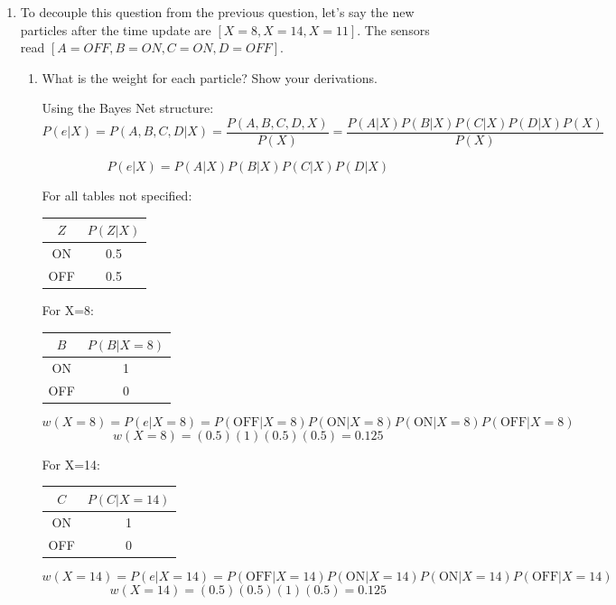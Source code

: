\documentclass[12pt]{article}
\begin{document}
\begin{enumerate}
\item To decouple this question from the previous question, let's say
  the new particles after the time update are $[X=8, X=14, X=11]$.
  The sensors read $[A=OFF, B=ON, C=ON, D=OFF]$.

  \begin{enumerate}

  \item What is the weight for each particle?  Show your derivations.

  Using the Bayes Net structure:
  \[
    P(e|X) = P(A,B,C,D|X) = \frac{P(A,B,C,D,X)}{P(X)} = \frac{P(A|X)P(B|X)P(C|X)P(D|X)P(X)}{P(X)}
  \]

  \[
    P(e|X) = P(A|X)P(B|X)P(C|X)P(D|X)
  \]

  For all tables not specified: 
  \begin{center}
    \begin{tabular}{|c|c|}
      \hline
      $Z$ & $P(Z|X)$ \\
      \hline
      ON & 0.5 \\
      \hline
      OFF & 0.5 \\
      \hline
    \end{tabular}
  \end{center}

  For X=8:
  \begin{center}
    \begin{tabular}{|c|c|}
      \hline
      $B$ & $P(B|X=8)$ \\
      \hline
      ON & 1 \\
      \hline
      OFF & 0 \\
      \hline
    \end{tabular}
  \end{center}
  \[
    w(X=8) = P(e|X=8) = P(\text{OFF}|X=8) P(\text{ON}|X=8) P(\text{ON}|X=8) P(\text{OFF}|X=8)
  \]
  \[
    w(X=8) = (0.5)(1)(0.5)(0.5) = 0.125
  \]

  For X=14:
  \begin{center}
    \begin{tabular}{|c|c|}
      \hline
      $C$ & $P(C|X=14)$ \\
      \hline
      ON & 1 \\
      \hline
      OFF & 0 \\
      \hline
    \end{tabular}
  \end{center}
  \[
    w(X=14) = P(e|X=14) = P(\text{OFF}|X=14) P(\text{ON}|X=14) P(\text{ON}|X=14) P(\text{OFF}|X=14)
  \]
  \[
    w(X=14) = (0.5)(0.5)(1)(0.5) = 0.125
  \]


\end{enumerate}
\end{enumerate}
\end{document}
